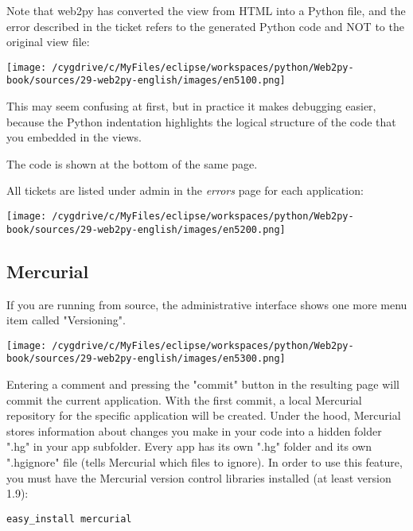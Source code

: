 \documentclass[justified,sixbynine,notoc]{tufte-book}
\def\inxx#1{\index{#1}}
\begin{document}
\begin{fullwidth}
Note that web2py has converted the view from HTML into a Python file, and the error described in the ticket refers to the generated Python code and NOT to the original view file:


\goodbreak\begin{center}\texttt{[image: /cygdrive/c/MyFiles/eclipse/workspaces/python/Web2py-book/sources/29-web2py-english/images/en5100.png]}\end{center}


This may seem confusing at first, but in practice it makes debugging easier, because the Python indentation highlights the logical structure of the code that you embedded in the views.

The code is shown at the bottom of the same page.

All tickets are listed under admin in the {\it errors} page for each application:


\goodbreak\begin{center}\texttt{[image: /cygdrive/c/MyFiles/eclipse/workspaces/python/Web2py-book/sources/29-web2py-english/images/en5200.png]}\end{center}


\goodbreak\subsection{Mercurial}

\inxx{Mercurial}

If you are running from source, the administrative interface shows one more menu item called "Versioning".


\goodbreak\begin{center}\texttt{[image: /cygdrive/c/MyFiles/eclipse/workspaces/python/Web2py-book/sources/29-web2py-english/images/en5300.png]}\end{center}


Entering a comment and pressing the "commit" button in the resulting page will commit the current application. With the first commit, a local Mercurial repository for the specific
application will be created.
Under the hood, Mercurial stores information about changes you make in your code into a hidden folder ".hg" in your app subfolder. Every app has its own ".hg" folder and its own ".hgignore" file (tells Mercurial which files to ignore).
In order to use this feature, you must have the Mercurial version control libraries installed (at least version 1.9):

\begin{lstlisting}
easy_install mercurial
\end{lstlisting}


\end{fullwidth}
\end{document}
